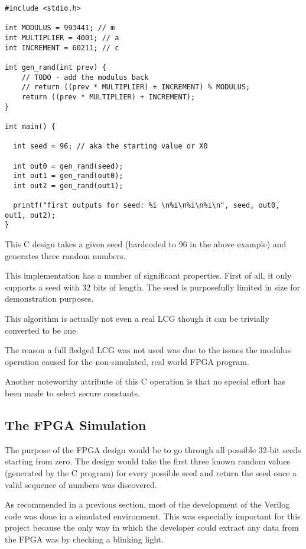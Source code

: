 \documentclass{article}
\begin{document}
    \begin{lstlisting}
#include <stdio.h>

int MODULUS = 993441; // m
int MULTIPLIER = 4001; // a
int INCREMENT = 60211; // c

int gen_rand(int prev) {
    // TODO - add the modulus back
    // return ((prev * MULTIPLIER) + INCREMENT) % MODULUS;
    return ((prev * MULTIPLIER) + INCREMENT);
}

int main() {

  int seed = 96; // aka the starting value or X0

  int out0 = gen_rand(seed);
  int out1 = gen_rand(out0);
  int out2 = gen_rand(out1);

  printf("first outputs for seed: %i \n%i\n%i\n%i\n", seed, out0, out1, out2);
}
    \end{lstlisting}

    This C design takes a given seed (hardcoded to 96 in the above example)
    and generates three random numbers.

    This implementation has a number of significant properties.
    First of all, it only supports a seed with 32 bits of length.
    The seed is purposefully limited in size for demonstration purposes.

    This algorithm is actually not even a real LCG though it can
    be trivially converted to be one.

    The reason a full fledged LCG was not used was due
    to the issues the modulus operation caused for the non-simulated,
    real world FPGA program.

    Another noteworthy attribute of this C operation is
    that no special effort has been made to select secure constants.

    \subsection{The FPGA Simulation}

    The purpose of the FPGA design would be to go through all possible
    32-bit seeds starting from zero.
    The design would take the first three known random values
    (generated by the C program) for every possible seed
    and return the seed once a valid sequence of numbers was discovered.

    As recommended in a previous section, most of the development
    of the Verilog code was done in a simulated environment.
    This was especially important for this project because
    the only way in which the developer could extract any data
    from the FPGA was by checking a blinking light.
\end{document}
